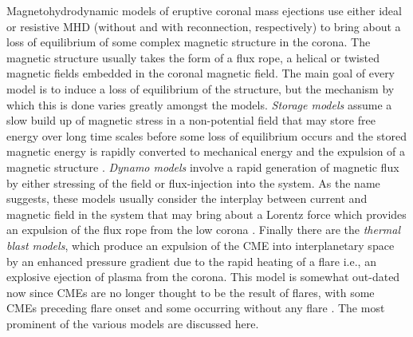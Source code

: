 Magnetohydrodynamic models of eruptive coronal mass ejections use either ideal or resistive MHD (without and with reconnection, respectively) to bring about a loss of equilibrium of some complex magnetic structure in the corona. The magnetic structure usually takes the form of a flux rope, a helical or twisted magnetic fields embedded in the coronal magnetic field. The main goal of every model is to induce a loss of equilibrium of the structure, but the mechanism by which this is done varies greatly amongst the models. {\it Storage models} assume a slow build up of magnetic stress in a non-potential field that may store free energy over long time scales before some loss of equilibrium occurs and the stored magnetic energy is rapidly converted to mechanical energy and the expulsion of a magnetic structure \citep{wolfson1998, forbes1995, antiochos1999}. {\it Dynamo models} involve a rapid generation of magnetic flux by either stressing of the field or flux-injection into the system. As the name suggests, these models usually consider the interplay between current and magnetic field in the system that may bring about a Lorentz force which provides an expulsion of the flux rope from the low corona \citep{chen1989, krall2001, schrijver2008, fan2005}. Finally there are the {\it thermal blast models}, which produce an expulsion of the CME into interplanetary space by an enhanced pressure gradient due to the rapid heating of a flare i.e., an explosive ejection of plasma from the corona.  This model is somewhat out-dated now since CMEs are no longer thought to be the result of flares, with some CMEs preceding flare onset and some occurring without any flare \citep{gosling1993}. The most prominent of the various models are discussed here.



